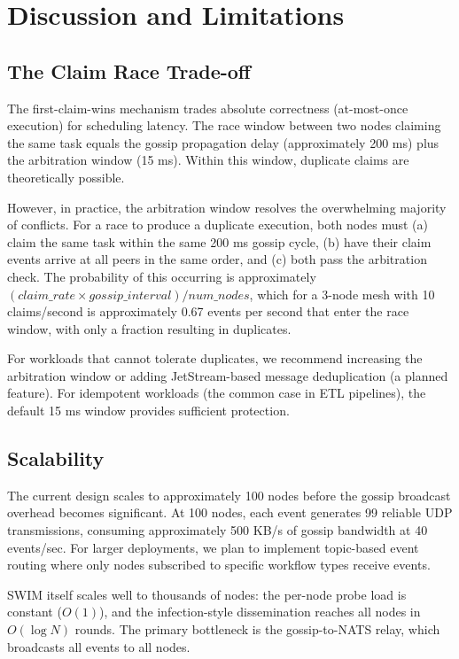 \section{Discussion and Limitations}

\subsection{The Claim Race Trade-off}

The first-claim-wins mechanism trades absolute correctness (at-most-once execution) for scheduling latency. The race window between two nodes claiming the same task equals the gossip propagation delay (approximately 200 ms) plus the arbitration window (15 ms). Within this window, duplicate claims are theoretically possible.

However, in practice, the arbitration window resolves the overwhelming majority of conflicts. For a race to produce a duplicate execution, both nodes must (a) claim the same task within the same 200 ms gossip cycle, (b) have their claim events arrive at all peers in the same order, and (c) both pass the arbitration check. The probability of this occurring is approximately $(claim\_rate \times gossip\_interval) / num\_nodes$, which for a 3-node mesh with 10 claims/second is approximately 0.67 events per second that enter the race window, with only a fraction resulting in duplicates.

For workloads that cannot tolerate duplicates, we recommend increasing the arbitration window or adding JetStream-based message deduplication (a planned feature). For idempotent workloads (the common case in ETL pipelines), the default 15 ms window provides sufficient protection.

\subsection{Scalability}

The current design scales to approximately 100 nodes before the gossip broadcast overhead becomes significant. At 100 nodes, each event generates 99 reliable UDP transmissions, consuming approximately 500 KB/s of gossip bandwidth at 40 events/sec. For larger deployments, we plan to implement topic-based event routing where only nodes subscribed to specific workflow types receive events.

SWIM itself scales well to thousands of nodes: the per-node probe load is constant ($O(1)$), and the infection-style dissemination reaches all nodes in $O(\log N)$ rounds. The primary bottleneck is the gossip-to-NATS relay, which broadcasts all events to all nodes.

